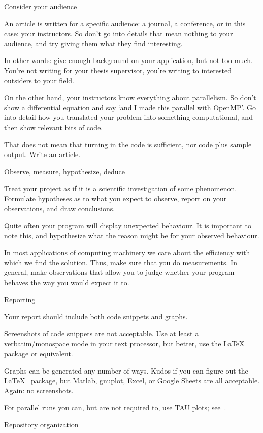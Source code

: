  {Consider your audience}

An article is written for a specific audience: a journal,  a conference,
or in this case: your instructors.
So don't go into details that mean nothing to your audience, and
try giving them what they find interesting.

In other words: give enough background on your application, but not too much.
You're not writing for your thesis supervisor, you're writing to
interested outsiders to your field.

On the other hand, your instructors know everything about parallelism.
So don't show a differential equation and say `and I made this parallel with OpenMP'.
Go into detail how you translated your problem into something computational,
and then show relevant bits of code.

That does not mean that turning in the code is sufficient, nor code plus sample output.
Write an article.

 {Observe, measure, hypothesize, deduce}

Treat 
your project as if it is a scientific investigation of some
phenomenon. Formulate hypotheses as to what you expect to observe,
report on your observations, and draw conclusions.

Quite often your program will display unexpected behaviour.
It is important to note this,
and hypothesize what the reason might be for your observed behaviour.

In most applications of computing machinery we care about the efficiency with which
we find the solution. Thus, make sure that you do measurements. In general, make
observations that allow you to judge whether your program behaves the way you
would expect it to.

 {Reporting}

Your report should
include both code snippets and graphs.

Screenshots of code snippets are not acceptable.
Use at least a verbatim/monospace mode in your text processor,
but better, use the \LaTeX\  package or equivalent.

Graphs can be generated any number of ways.
Kudos if you can figure out the \LaTeX\  package,
but Matlab, gnuplot, Excel, or Google Sheets are all  acceptable.
Again: no screenshots.

For parallel runs you can, but are not required to,
use TAU plots; see~.

 {Repository organization}

